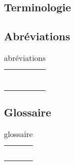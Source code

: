 \textcolor[RGB]{46, 116, 181}{\chapter{Terminologie}}
\section{Abréviations}
\begin{table}[!h]
\begin{tabular}{p{2.5cm}p{13.5cm}}
  &\\
  &\\
  &\\
  &\\
  &\\
  &\\
  &\\
\end{tabular}
\caption{abréviations}
\end{table}

\section{Glossaire}
\begin{table}[!h]
\begin{tabular}{lp{13.5cm}}
  &\\
  &\\
  &\\
  &\\
  &\\
\end{tabular}
\caption{glossaire}
\end{table}
\printglossaries
